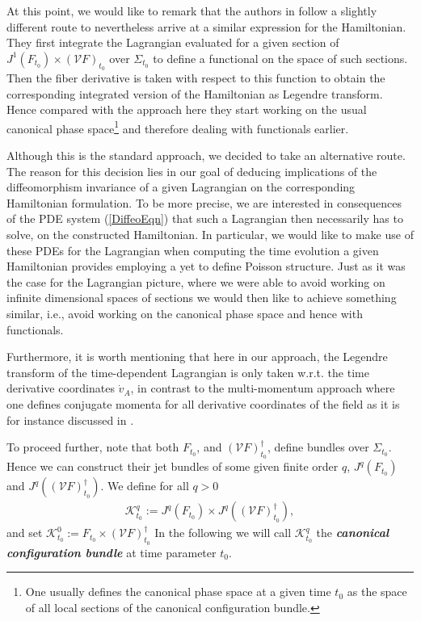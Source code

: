 \documentclass[a4paper,12pt, DIV=14, BCOR=5mm, twoside, headsepline, numbers=noenddot]{scrbook}
\begin{document}
At this point, we would like to remark that the authors in \cite{2004math.ph..11032G} follow a slightly different route to nevertheless arrive at a similar expression for the Hamiltonian. They first integrate the Lagrangian evaluated for a given section of $J^1(F_{t_0}) \times (\mathcal{V}F)_{t_0}$ over $\Sigma_{t_0}$ to define a functional on the space of such sections. Then the fiber derivative is taken with respect to this function to obtain the corresponding integrated version of the Hamiltonian as Legendre transform. 
Hence compared with the approach here they start working on the usual canonical phase space\footnote{One usually defines the canonical phase space at a given time $t_0$ as the space of all local sections of the canonical configuration bundle.} and therefore dealing with functionals earlier. 

Although this is the standard approach, we decided to take an alternative route. The reason for this decision lies in our goal of deducing implications of the diffeomorphism invariance of a given Lagrangian on the corresponding Hamiltonian formulation. To be more precise, we are interested in consequences of the PDE system (\ref{DiffeoEqn}) that such a Lagrangian then necessarily has to solve, on the constructed Hamiltonian. In particular, we would like to make use of these PDEs for the Lagrangian when computing the time evolution a given Hamiltonian provides employing a yet to define Poisson structure. Just as it was the case for the Lagrangian picture, where we were able to avoid working on infinite dimensional spaces of sections we would then like to achieve something similar, i.e., avoid working on the canonical phase space and hence with functionals.

Furthermore, it is worth mentioning that here in our approach, the Legendre transform of the time-dependent Lagrangian is only taken w.r.t. the time derivative coordinates $\dot{v}_A$, in contrast to the multi-momentum approach where one defines conjugate momenta for all derivative coordinates of the field as it is for instance discussed in \cite{1998physics...1019G}. 

To proceed further, note that both $F_{t_0}$, and $(\mathcal{V}F)_{t_0}^{\dagger}$, define bundles over $\Sigma_{t_0}$. Hence we can construct their jet bundles of some given finite order $q$, $J^q(F_{t_0})$ and $J^q((\mathcal{V}F)_{t_0}^{\dagger})$. 
We define for all $q>0$
\begin{align} 
\mathcal{K}^q_{t_0} := J^q(F_{t_0})\times J^q((\mathcal{V}F)_{t_0}^{\dagger}),
\end{align}
and set $\mathcal{K}^0_{t_0} := F_{t_0}\times (\mathcal{V}F)_{t_0}^{\dagger}$
In the following we will call $\mathcal{K}^q_{t_0}$ the \textit{\textbf{canonical configuration bundle}} at time parameter $t_0$. 
\end{document}
